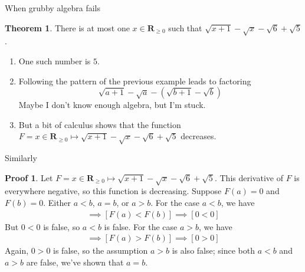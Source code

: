 \documentclass[fleqn]{beamer}
\newcommand{\reals}{\mathbf{R}}
\theoremstyle{definition}
\newtheorem{myth}{Theorem}
\newtheorem{myproof}{Proof}
\begin{document}
\begin{frame}{When grubby algebra fails}

\begin{myth} There is at most one \(x \in \reals_{\geq 0} \) such that \(\sqrt{x+1}-\sqrt{x}-\sqrt{6}+\sqrt{5}\). \end{myth}

\begin{enumerate}

\item One such number is \(5\).  

\item Following the pattern of the previous example leads to factoring
\[
\sqrt{a+1}-\sqrt{a} - (\sqrt{b+1}-\sqrt{b})
\]
Maybe I don't know enough algebra, but I'm stuck.

\item But a bit of calculus shows that the function \(F = x \in \reals_{\geq 0} \mapsto \sqrt{x+1}-\sqrt{x}-\sqrt{6}+\sqrt{5}\) decreases.
\end{enumerate}

\end{frame}
\begin{frame}{Similarly}

\begin{myproof} Let \(F = x \in \reals_{\geq 0} \mapsto \sqrt{x+1}-\sqrt{x}-\sqrt{6}+\sqrt{5}\).  This derivative of \(F\) is everywhere negative, so this function is  decreasing. 
Suppose \(F(a) = 0\) and \(F(b) = 0\).  Either \(a < b\), \(a = b\), or \(a > b\).  For the case \(a < b\), we have
\begin{align*}
[a < b ] \implies [F(a) < F(b)] \implies [0 < 0] 
\end{align*}
But \(0 < 0\) is false, so \(a < b\) is false.  For the case \(a > b\), we have
\begin{align*}
[a > b ] \implies [F(a) > F(b)] \implies [0 > 0] 
\end{align*}
Again, \(0 > 0\) is false, so the assumption \(a > b\) is also false; since both \(a < b\) and \(a > b\) are false, we've shown that \(a=b\).


\end{myproof} 


\end{frame}
\end{document}
